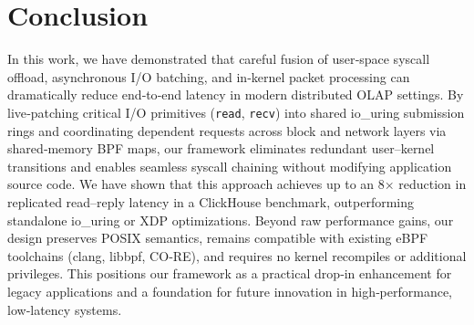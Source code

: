 \documentclass[sigconf,10pt]{acmart}
\begin{document}
\section{Conclusion}

In this work, we have demonstrated that careful fusion of user‐space syscall offload, asynchronous I/O batching, and in‐kernel packet processing can dramatically reduce end‐to‐end latency in modern distributed OLAP settings.  By live‐patching critical I/O primitives (\texttt{read}, \texttt{recv}) into shared io\_uring submission rings and coordinating dependent requests across block and network layers via shared‐memory BPF maps, our framework eliminates redundant user–kernel transitions and enables seamless syscall chaining without modifying application source code.  We have shown that this approach achieves up to an 8× reduction in replicated read–reply latency in a ClickHouse benchmark, outperforming standalone io\_uring or XDP optimizations. Beyond raw performance gains, our design preserves POSIX semantics, remains compatible with existing eBPF toolchains (clang, libbpf, CO‐RE), and requires no kernel recompiles or additional privileges.  This positions our framework as a practical drop‐in enhancement for legacy applications and a foundation for future innovation in high‐performance, low‐latency systems.



\end{document}
